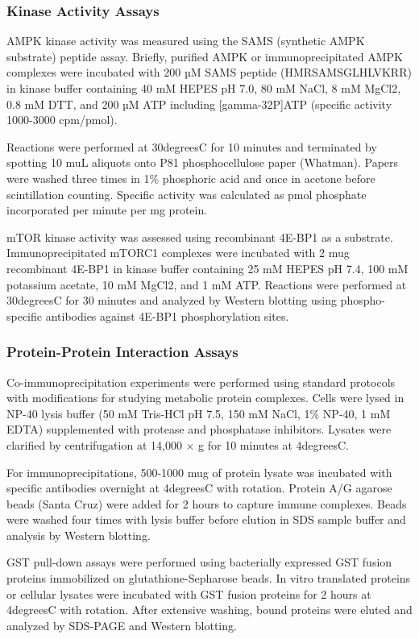 \documentclass[11pt,a4paper]{article}
\begin{document}
\subsubsection{Kinase Activity Assays}

AMPK kinase activity was measured using the SAMS (synthetic AMPK substrate) peptide assay. Briefly, purified AMPK or immunoprecipitated AMPK complexes were incubated with 200 µM SAMS peptide (HMRSAMSGLHLVKRR) in kinase buffer containing 40 mM HEPES pH 7.0, 80 mM NaCl, 8 mM MgCl2, 0.8 mM DTT, and 200 µM ATP including [gamma-32P]ATP (specific activity 1000-3000 cpm/pmol).

Reactions were performed at 30degreesC for 10 minutes and terminated by spotting 10 muL aliquots onto P81 phosphocellulose paper (Whatman). Papers were washed three times in 1\% phosphoric acid and once in acetone before scintillation counting. Specific activity was calculated as pmol phosphate incorporated per minute per mg protein.

mTOR kinase activity was assessed using recombinant 4E-BP1 as a substrate. Immunoprecipitated mTORC1 complexes were incubated with 2 mug recombinant 4E-BP1 in kinase buffer containing 25 mM HEPES pH 7.4, 100 mM potassium acetate, 10 mM MgCl2, and 1 mM ATP. Reactions were performed at 30degreesC for 30 minutes and analyzed by Western blotting using phospho-specific antibodies against 4E-BP1 phosphorylation sites.

\subsubsection{Protein-Protein Interaction Assays}

Co-immunoprecipitation experiments were performed using standard protocols with modifications for studying metabolic protein complexes. Cells were lysed in NP-40 lysis buffer (50 mM Tris-HCl pH 7.5, 150 mM NaCl, 1\% NP-40, 1 mM EDTA) supplemented with protease and phosphatase inhibitors. Lysates were clarified by centrifugation at 14,000 × g for 10 minutes at 4degreesC.

For immunoprecipitations, 500-1000 mug of protein lysate was incubated with specific antibodies overnight at 4degreesC with rotation. Protein A/G agarose beads (Santa Cruz) were added for 2 hours to capture immune complexes. Beads were washed four times with lysis buffer before elution in SDS sample buffer and analysis by Western blotting.

GST pull-down assays were performed using bacterially expressed GST fusion proteins immobilized on glutathione-Sepharose beads. In vitro translated proteins or cellular lysates were incubated with GST fusion proteins for 2 hours at 4degreesC with rotation. After extensive washing, bound proteins were eluted and analyzed by SDS-PAGE and Western blotting.
\end{document}
